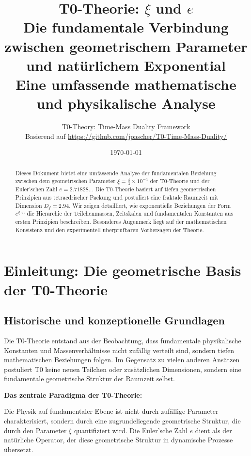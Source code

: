 \documentclass[12pt,a4paper]{article}
\title{\textbf{T0-Theorie: $\xi$ und $e$}\\[0.5cm]
	\large Die fundamentale Verbindung zwischen geometrischem Parameter\\
	und natürlichem Exponential\\[0.3cm]
	\normalsize Eine umfassende mathematische und physikalische Analyse}
\author{T0-Theory: Time-Mass Duality Framework\\ \small Basierend auf \url{https://github.com/jpascher/T0-Time-Mass-Duality/}}
\date{\today}
\newcommand{\xipar}{\xi}
\begin{document}
	
	\maketitle
	
	\begin{abstract}
		Dieses Dokument bietet eine umfassende Analyse der fundamentalen Beziehung zwischen dem geometrischen Parameter $\xipar = \frac{4}{3} \times 10^{-4}$ der T0-Theorie und der Euler'schen Zahl $e = 2.71828\ldots$ Die T0-Theorie basiert auf tiefen geometrischen Prinzipien aus tetraedrischer Packung und postuliert eine fraktale Raumzeit mit Dimension $D_f = 2.94$. Wir zeigen detailliert, wie exponentielle Beziehungen der Form $e^{\xipar \cdot n}$ die Hierarchie der Teilchenmassen, Zeitskalen und fundamentalen Konstanten aus ersten Prinzipien beschreiben. Besonderes Augenmerk liegt auf der mathematischen Konsistenz und den experimentell überprüfbaren Vorhersagen der Theorie.
	\end{abstract}
	
	\tableofcontents
	\newpage
	
	\section{Einleitung: Die geometrische Basis der T0-Theorie}
	
	\subsection{Historische und konzeptionelle Grundlagen}
	
	Die T0-Theorie entstand aus der Beobachtung, dass fundamentale physikalische Konstanten und Massenverhältnisse nicht zufällig verteilt sind, sondern tiefen mathematischen Beziehungen folgen. Im Gegensatz zu vielen anderen Ansätzen postuliert T0 keine neuen Teilchen oder zusätzlichen Dimensionen, sondern eine fundamentale geometrische Struktur der Raumzeit selbst.
	
	\begin{erkenntnis}
		\textbf{Das zentrale Paradigma der T0-Theorie:}
		
		Die Physik auf fundamentaler Ebene ist nicht durch zufällige Parameter charakterisiert, sondern durch eine zugrundeliegende geometrische Struktur, die durch den Parameter $\xi$ quantifiziert wird. Die Euler'sche Zahl $e$ dient als der natürliche Operator, der diese geometrische Struktur in dynamische Prozesse übersetzt.
	\end{erkenntnis}
	
\end{document}

